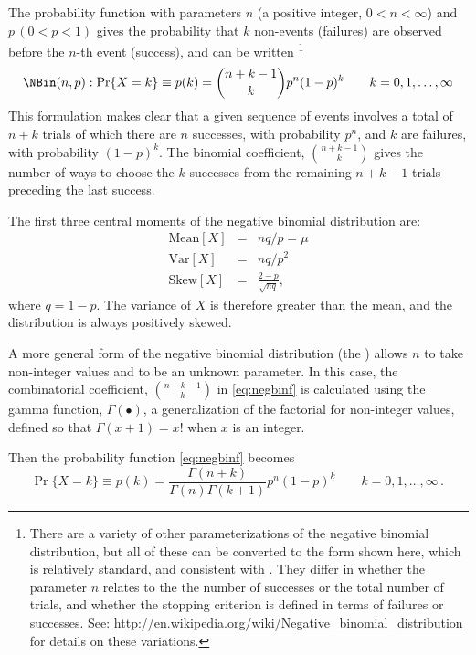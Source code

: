 \documentclass[11pt]{book}
\begin{document}
The probability function with parameters $n$ (a positive integer, $0 < n < \infty$) and $p \, (0 < p < 1)$
gives the probability that $k$ non-events (failures) are observed before
the $n$-th event (success), and
can be written%
\footnote{
There are a variety of other parameterizations of the negative binomial distribution,
but all of these can be converted to the form shown here, which is relatively
standard, and consistent with \R. They differ in whether the parameter $n$
relates to the the number of successes or the total number of trials, and
whether the stopping criterion is defined in terms of failures or successes.
See: \url{http://en.wikipedia.org/wiki/Negative_binomial_distribution}
for details on these variations.
}
\begin{equation}\label{eq:negbinf}
\NBin(n,p):   \Pr \{ X = k \} \equiv p(k)  =
  {n+k-1 \choose k} p^n (1-p)^k
  \quad\quad k = 0, 1, \dots , \infty
\end{equation}
This formulation makes clear that a given sequence of events involves 
a total of $n+k$ trials of which there are $n$ successes,
with probability $p^n$, and $k$ are failures, with probability $(1-p)^k$.
The binomial coefficient, ${n+k-1 \choose k}$ gives the number of ways
to choose the $k$ successes from the remaining $n+k-1$ trials preceding
the last success.

The first three central moments of the negative binomial distribution are:
\begin{eqnarray*}
\textrm{Mean}[X] &=&nq / p  = \mu \\
\textrm{Var}[X] &=&nq / p^2 \\
\textrm{Skew}[X] &=&\frac{2-p}{\sqrt{nq}}
\comma
\end{eqnarray*}
where $q=1-p$. The variance of $X$ is therefore greater than the mean,
and the distribution is always positively skewed.

A more general form of the negative binomial distribution 
(the )
allows $n$ to take non-integer values and to be an unknown
parameter.
In this case, the combinatorial coefficient,
${n+k-1 \choose k}$ in \eqref{eq:negbinf} is calculated using
the gamma function, $\Gamma(\bullet)$,
a generalization of the factorial for non-integer values,
defined so that $\Gamma(x+1) = x!$ when $x$ is an integer.

Then the probability function \eqref{eq:negbinf} becomes
\begin{equation}\label{eq:negbinf2}
  \Pr \{ X = k \} \equiv p(k)  =
  \frac{\Gamma(n+k)}{\Gamma(n) \Gamma(k+1)}
   p^n (1-p)^k
  \quad\quad k = 0, 1, \dots , \infty
  \period
\end{equation}
\end{document}
